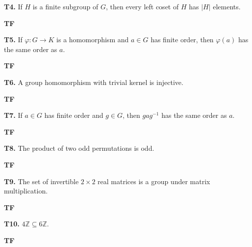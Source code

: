 \documentclass[11pt]{article}
\begin{document}
\par\noindent\textbf{T4.} If $H$ is a finite subgroup of $G$, then every left coset of $H$ has $|H|$ elements.
\par\nobreak\hfill\textbf{T\qquad F}\par\vspace{0.2em}
\par\noindent\textbf{T5.} If $\varphi:G\to K$ is a homomorphism and $a\in G$ has finite order, then $\varphi(a)$ has the same order as $a$.
\par\nobreak\hfill\textbf{T\qquad F}\par\vspace{0.2em}
\par\noindent\textbf{T6.} A group homomorphism with trivial kernel is injective.
\par\nobreak\hfill\textbf{T\qquad F}\par\vspace{0.2em}
\par\noindent\textbf{T7.} If $a\in G$ has finite order and $g\in G$, then $gag^{-1}$ has the same order as $a$.
\par\nobreak\hfill\textbf{T\qquad F}\par\vspace{0.2em}
\par\noindent\textbf{T8.} The product of two odd permutations is odd.
\par\nobreak\hfill\textbf{T\qquad F}\par\vspace{0.2em}
\par\noindent\textbf{T9.} The set of invertible $2\times2$ real matrices is a group under matrix multiplication.
\par\nobreak\hfill\textbf{T\qquad F}\par\vspace{0.2em}
\par\noindent\textbf{T10.} $4\mathbb Z\subseteq6\mathbb Z$.
\par\nobreak\hfill\textbf{T\qquad F}\par\vspace{0.2em}
\end{document}
